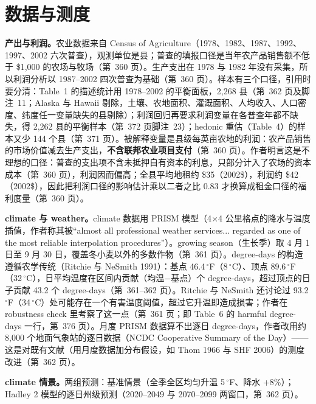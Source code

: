 \section{数据与测度}

\textbf{产出与利润。}农业数据来自 Census of Agriculture（1978、1982、1987、1992、1997、2002 六次普查），观测单位是县；普查的填报口径是当年农产品销售额不低于 \$1{,}000 的农场与牧场（第~360 页）。生产支出在 1978 与 1982 年没有采集，所以利润分析以 1987--2002 四次普查为基础（第~360 页）。样本有三个口径，引用时要分清：Table~1 的描述统计用 1978--2002 的平衡面板，2{,}268 县（第~362 页及脚注~11；Alaska 与 Hawaii 剔除，土壤、农地面积、灌溉面积、人均收入、人口密度、纬度任一变量缺失的县剔除）；利润回归再要求利润变量在各普查年都不缺失，得 2{,}262 县的平衡样本（第~372 页脚注~23）；hedonic 重估（Table~4）的样本又少 144 个县（第~371 页）。被解释变量是县级每英亩农地的利润：农产品销售的市场价值减去生产支出，\textbf{不含联邦农业项目支付}（第~360 页）。作者明言这是不理想的口径：普查的支出项不含未抵押自有资本的利息，只部分计入了农场的资本成本（第~360 页），利润因而偏高；全县平均地租约 \$35（2002\$），利润约 \$42（2002\$），因此把利润口径的影响估计乘以二者之比 0.83 才换算成租金口径的福利度量（第~360 页）。

\textbf{climate 与 weather。}climate 数据用 PRISM 模型（4$\times$4 公里格点的降水与温度插值，作者称其被``almost all professional weather services... regarded as one of the most reliable interpolation procedures''\citep[第~361 页]{deschenes2007economic}）。growing season（生长季）取 4 月 1 日至 9 月 30 日，覆盖冬小麦以外的多数作物（第~361 页）。degree-days 的构造遵循农学传统（Ritchie 与 NeSmith 1991）：基点 46.4\,$^\circ$F（8\,$^\circ$C）、顶点 89.6\,$^\circ$F（32\,$^\circ$C），日平均温度在区间内贡献（均温$-$基点）个 degree-days，超过顶点的日子贡献 43.2 个 degree-days（第~361--362 页）。Ritchie 与 NeSmith 还讨论过 93.2\,$^\circ$F（34\,$^\circ$C）处可能存在一个有害温度阈值，超过它升温即造成损害；作者在 robustness check 里考察了这一点（第~361 页；即 Table~6 的 harmful degree-days 一行，第~376 页）。月度 PRISM 数据算不出逐日 degree-days，作者改用约 8{,}000 个地面气象站的逐日数据（NCDC Cooperative Summary of the Day）——这是对既有文献（用月度数据加分布假设，如 Thom 1966 与 SHF 2006）的测度改进（第~362 页）。

\textbf{climate 情景。}两组预测：基准情景（全季全区均匀升温 5\,$^\circ$F、降水 +8\%）；Hadley 2 模型的逐日州级预测（2020--2049 与 2070--2099 两窗口，第~362 页）。

